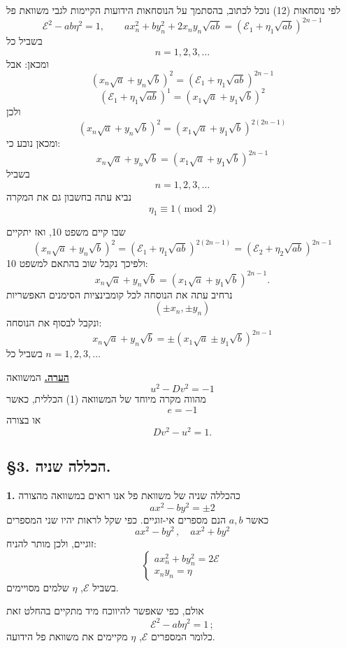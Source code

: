 \noindent לפי נוסחאות (12) נוכל לכתוב, בהסתמך על הנוסחאות הידועות הקיימות לגבי משוואת פל
\[ \mathcal{E}^2 - ab\eta^2 = 1, \qquad ax_n^2 + by_n^2 + 2x_ny_n\sqrt{ab} = (\mathcal{E}_1 + \eta_1\sqrt{ab})^{2n-1} \]
בשביל כל
\[ n = 1 , 2 , 3 , \ldots \]
ומכאן: אבל
\[ (x_n\sqrt{a} + y_n\sqrt{b})^2 = (\mathcal{E}_1 + \eta_1\sqrt{ab})^{2n-1} \]
\[ (\mathcal{E}_1 + \eta_1\sqrt{ab})^1 = (x_1\sqrt{a} + y_1\sqrt{b})^2 \]
ולכן
\[ (x_n\sqrt{a} + y_n\sqrt{b})^2 = (x_1\sqrt{a} + y_1\sqrt{b})^{2(2n-1)} \]
ומכאן נובע כי:
\[ x_n\sqrt{a} + y_n\sqrt{b} = (x_1\sqrt{a} + y_1\sqrt{b})^{2n-1} \]
בשביל
\[ n = 1 , 2 , 3 , \ldots \]
נביא עתה בחשבון גם את המקרה
\[ \eta_1 \equiv 1 \pmod{2} \]

\noindent שבו קיים משפט 10, ואז יתקיים
\[ (x_n\sqrt{a} + y_n\sqrt{b})^2 = (\mathcal{E}_1 + \eta_1\sqrt{ab})^{2(2n-1)} = (\mathcal{E}_2 + \eta_2\sqrt{ab})^{2n-1} \]
ולפיכך נקבל שוב בהתאם למשפט 10:
\[ x_n\sqrt{a} + y_n\sqrt{b} = (x_1\sqrt{a} + y_1\sqrt{b})^{2n-1} . \]
נרחיב עתה את הנוסחה לכל קומבינציות הסימנים האפשריות
\[ (\pm x_n , \pm y_n) \]
ונקבל לבסוף את הנוסחה:
\[ \boxed{x_n\sqrt{a} + y_n\sqrt{b} = \pm(x_1\sqrt{a} \pm y_1\sqrt{b})^{2n-1}} \tag{13} \]
בשביל כל $n = 1 , 2 , 3 , \ldots$

\medskip
\noindent\textbf{\underline{הערה.}} המשוואה
\[ u^2 - Dv^2 = -1 \]
מהווה מקרה מיוחד של המשוואה (1) הכללית, כאשר
\[ e = -1 \]
או בצורה
\[ Dv^2 - u^2 = 1 . \]

\subsection*{\S3. הכללה שניה.}

\noindent\textbf{1.} כהכללה שניה של משוואת פל אנו רואים במשוואה מהצורה
\[ ax^2 - by^2 = \pm 2 \tag{1} \]
כאשר $a,b$ הנם מספרים אי-זוגיים. כפי שקל לראות יהיו שני המספרים
\[ ax^2 - by^2 \, , \quad ax^2 + by^2 \]
זוגיים, ולכן מותר להניח:
\[ \begin{cases} ax_n^2 + by_n^2 = 2\mathcal{E} \\ x_ny_n = \eta \end{cases} \tag{2} \]
בשביל $\mathcal{E}$, $\eta$ שלמים מסויימים.

\noindent אולם, כפי שאפשר להיווכח מיד מתקיים בהחלט זאת
\[ \mathcal{E}^2 - ab\eta^2 = 1 \, ; \tag{3} \]
כלומר המספרים $\mathcal{E}$, $\eta$ מקיימים את משוואת פל הידועה.

